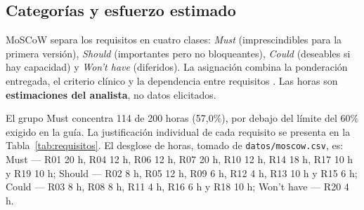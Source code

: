 ﻿\subsection{Categorías y esfuerzo estimado}

MoSCoW separa los requisitos en cuatro clases: \emph{Must} (imprescindibles para la primera versión), \emph{Should} (importantes pero no bloqueantes), \emph{Could} (deseables si hay capacidad) y \emph{Won't have} (diferidos). La asignación combina la ponderación entregada, el criterio clínico y la dependencia entre requisitos \cite{wiegers2013}. Las horas son \textbf{estimaciones del analista}, no datos elicitados.

\begin{table}[htbp]
\centering
\footnotesize
\caption{Esfuerzo estimado por categoría MoSCoW.}
\label{tab:esfuerzo}
\end{table}

El grupo Must concentra 114 de 200 horas (57,0\%), por debajo del límite del 60\% exigido en la guía. La justificación individual de cada requisito se presenta en la Tabla~\ref{tab:requisitos}. El desglose de horas, tomado de \texttt{datos/moscow.csv}, es: Must --- R01 20 h, R04 12 h, R06 12 h, R07 20 h, R10 12 h, R14 18 h, R17 10 h y R19 10 h; Should --- R02 8 h, R05 12 h, R09 6 h, R12 4 h, R13 10 h y R15 6 h; Could --- R03 8 h, R08 8 h, R11 4 h, R16 6 h y R18 10 h; Won't have --- R20 4 h.


